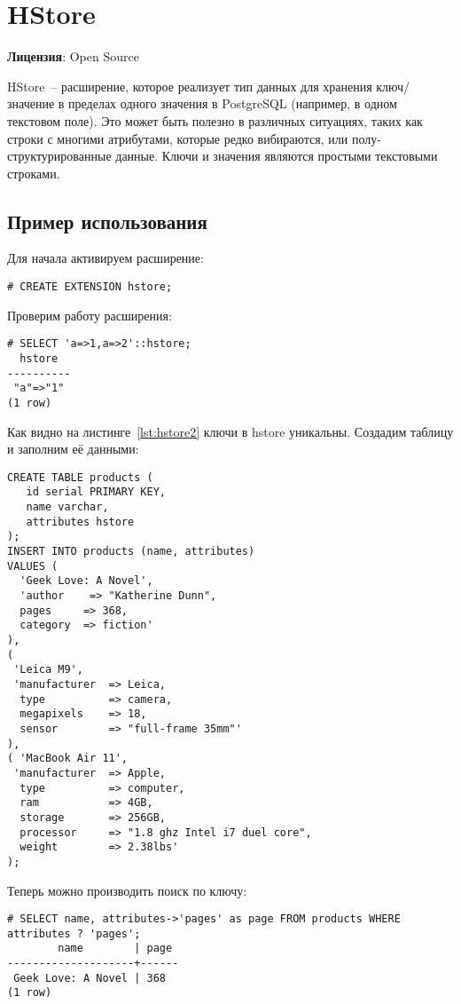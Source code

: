 \section{HStore}
\textbf{Лицензия}: Open Source

HStore~-- расширение, которое реализует тип данных для хранения ключ/значение в пределах одного значения в PostgreSQL (например, в одном текстовом поле). Это может быть полезно в различных ситуациях, таких как строки с многими атрибутами, которые редко вибираются, или полу-структурированные данные. Ключи и значения являются простыми текстовыми строками.

\subsection{Пример использования}
Для начала активируем расширение:
\begin{lstlisting}[label=lst:hstore1,caption=Активация hstore]
# CREATE EXTENSION hstore;
\end{lstlisting}

Проверим работу расширения:
\begin{lstlisting}[label=lst:hstore2,caption=Проверка hstore]
# SELECT 'a=>1,a=>2'::hstore;
  hstore
----------
 "a"=>"1"
(1 row)
\end{lstlisting}

Как видно на листинге~\ref{lst:hstore2} ключи в hstore уникальны. Создадим таблицу и заполним её данными:

\begin{lstlisting}[label=lst:hstore3,caption=Проверка hstore]
CREATE TABLE products (
   id serial PRIMARY KEY,
   name varchar,
   attributes hstore
);
INSERT INTO products (name, attributes)
VALUES (
  'Geek Love: A Novel',
  'author    => "Katherine Dunn",
  pages     => 368,
  category  => fiction'
),
(
 'Leica M9',
 'manufacturer  => Leica,
  type          => camera,
  megapixels    => 18,
  sensor        => "full-frame 35mm"'
),
( 'MacBook Air 11',
 'manufacturer  => Apple,
  type          => computer,
  ram           => 4GB,
  storage       => 256GB,
  processor     => "1.8 ghz Intel i7 duel core",
  weight        => 2.38lbs'
);
\end{lstlisting}

Теперь можно производить поиск по ключу:
\begin{lstlisting}[label=lst:hstore4,caption=Поиск по ключу]
# SELECT name, attributes->'pages' as page FROM products WHERE attributes ? 'pages';
        name        | page
--------------------+------
 Geek Love: A Novel | 368
(1 row)
\end{lstlisting}

